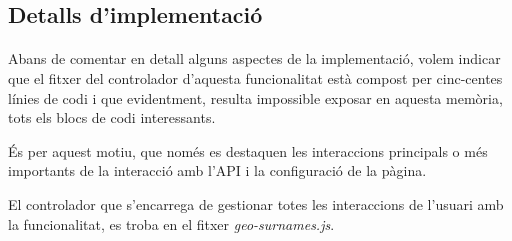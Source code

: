 \subsection{Detalls d'implementació}

    \paragraph{}
    Abans de comentar en detall alguns aspectes de la implementació, volem indicar que el fitxer del controlador d'aquesta funcionalitat està compost per cinc-centes línies de codi i que evidentment, resulta impossible exposar en aquesta memòria, tots els blocs de codi interessants.

    És per aquest motiu, que només es destaquen les interaccions principals o més importants de la interacció amb l'API i la configuració de la pàgina.

    El controlador que s'encarrega de gestionar totes les interaccions de l'usuari amb la funcionalitat, es troba en el fitxer \emph{geo-surnames.js}.

    
    
    
    
